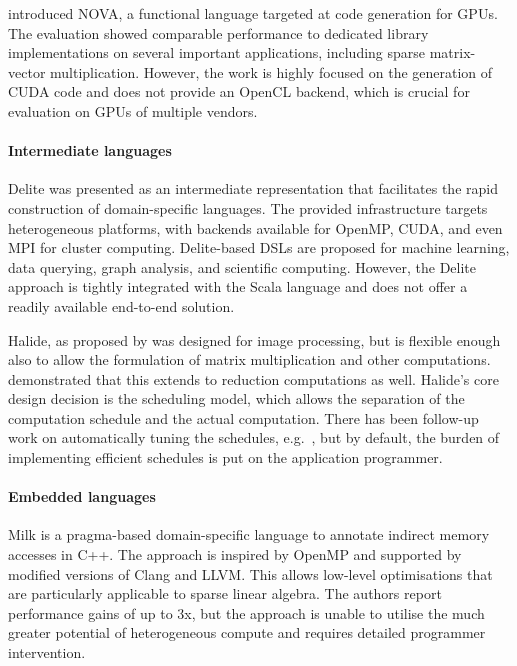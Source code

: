    \citet{collins14nova} introduced NOVA, a functional language targeted at
    code generation for GPUs.
    The evaluation showed comparable performance to dedicated library
    implementations on several important applications, including sparse
    matrix-vector multiplication.
    However, the work is highly focused on the generation of CUDA code and does
    not provide an OpenCL backend, which is crucial for evaluation on GPUs of
    multiple vendors.

    \paragraph*{Intermediate languages}
    Delite \citep{Sujeeth:2014:DCA:2601432.2584665} was presented as an
    intermediate representation that facilitates the rapid construction of
    domain-specific languages.
    The provided infrastructure targets heterogeneous
    platforms, with backends available for OpenMP, CUDA, and even MPI for
    cluster computing.
    Delite-based DSLs are proposed for machine learning, data querying, graph
    analysis, and scientific computing.
    However, the Delite approach is tightly integrated with the Scala
    language and does not offer a readily available end-to-end solution.

    Halide, as proposed by \citet{Ragan-Kelley:2013:HLC:2499370.2462176}
    was designed for image processing, but is flexible enough also to allow the 
    formulation of matrix multiplication and other computations.
    \citet{Suriana:2017:PAR:3049832.3049863} demonstrated that this extends
    to reduction computations as well.
    Halide's core design decision is the scheduling model, which allows the
    separation of the computation schedule and the actual computation.
    There has been follow-up work on automatically tuning the schedules, e.g.\ 
    \citet{Mullapudi:2016:ASH:2897824.2925952}, but by default, the burden of
    implementing efficient schedules is put on the application programmer.

    \paragraph*{Embedded languages}
    Milk \citep{Kiriansky:2016:OIM:2967938.2967948} is a pragma-based
    domain-specific language to annotate indirect memory accesses in C++.
    The approach is inspired by OpenMP and supported by modified versions
    of Clang and LLVM.
    This allows low-level optimisations that are particularly applicable to
    sparse linear algebra.
    The authors report performance gains of up to 3x, but the approach is unable
    to utilise the much greater potential of heterogeneous compute and requires
    detailed programmer intervention.

